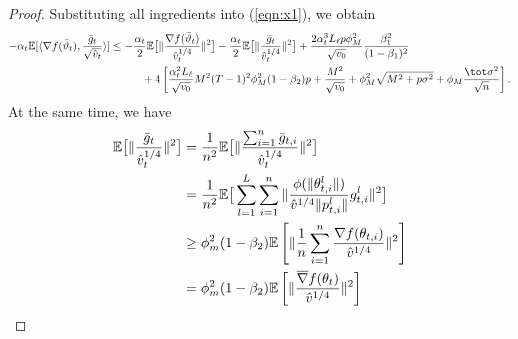 \documentclass[11pt]{article}
\begin{document}
\begin{proof}
Substituting all ingredients into (\ref{eqn:x1}), we obtain
\begin{align}\notag
    -\alpha_t \mathbb E[\langle \nabla f(\bar \vartheta_t),\frac{\bar g_t}{\sqrt{\hat v_t}} \rangle] &\leq -\frac{\alpha_t}{2}\mathbb E\big[\Vert \frac{\nabla f(\bar\vartheta_t) }{\hat v_t^{1/4}}\Vert^2 \big]-\frac{\alpha_t}{2}\mathbb E\big[\Vert \frac{\bar g_t }{\hat v_t^{1/4}}\Vert^2 \big]+\frac{2\alpha_t^3 L_\ell p\phi_M^2}{ \sqrt{v_0}}\frac{\beta_1^2}{(1-\beta_1)^2} \\\notag
    &\hspace{0.4in}  + 4 \left[ \frac{\alpha_t^2 L_\ell}{\sqrt{v_0}} M^2 (T-1)^2 \phi_M^2 (1-\beta_2)p + \frac{M^2}{\sqrt{v_0}}+\phi_M^2\sqrt{M^2+p\sigma^2} + \phi_M \frac{\tot \sigma^2}{\sqrt{n}}\right].
\end{align}
At the same time, we have
\begin{align}\notag
    \mathbb E\big[\Vert \frac{\bar g_t }{\hat v_t^{1/4}}\Vert^2\big]&=\frac{1}{n^2}\mathbb E\big[\Vert \frac{\sum_{i=1}^n \bar g_{t,i}}{\hat v_t^{1/4}}\Vert^2 \big]\\\notag
    &=\frac{1}{n^2}\mathbb E\big[ \sum_{l=1}^L \sum_{i=1}^n \Vert  \frac{\phi(\Vert \theta_{t,i}^l\Vert)}{\hat v^{1/4} \Vert p_{t,i}^l\Vert}g_{t,i}^l \Vert^2 \big]\\\notag
    &\geq \phi_m^2(1-\beta_2) \mathbb E\left[ \Vert \frac{1}{n}\sum_{i=1}^n \frac{\nabla f(\theta_{t,i})}{\hat v^{1/4}} \Vert^2 \right]\\\notag
    &=\phi_m^2(1-\beta_2) \mathbb E\left[ \Vert  \frac{\overline\nabla f(\theta_{t})}{\hat v^{1/4}} \Vert^2 \right]
\end{align}


\end{proof}
\end{document}
